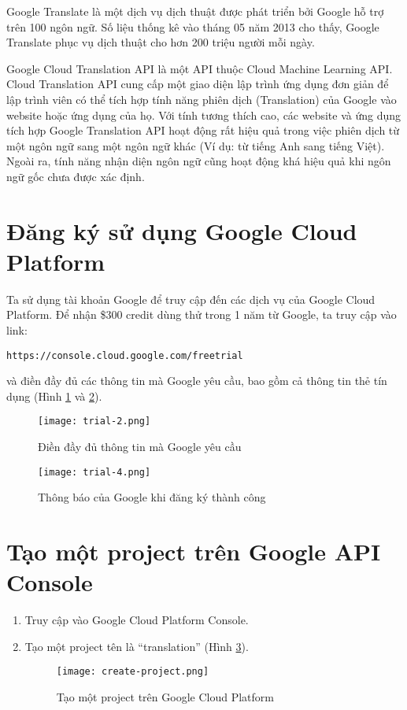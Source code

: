 \documentclass[../thesis.tex]{subfiles}
\begin{document}
Google Translate là một dịch vụ dịch thuật được phát triển bởi Google hỗ trợ trên 100 ngôn ngữ. Số liệu thống kê vào tháng 05 năm 2013 cho thấy, Google Translate phục vụ dịch thuật cho hơn 200 triệu người mỗi ngày.

Google Cloud Translation API là một API thuộc Cloud Machine Learning API. Cloud Translation API cung cấp một giao diện lập trình ứng dụng đơn giản để lập trình viên có thể tích hợp tính năng phiên dịch (Translation) của Google vào website hoặc ứng dụng của họ. Với tính tương thích cao, các website và ứng dụng tích hợp Google Translation API hoạt động rất hiệu quả trong việc phiên dịch từ một ngôn ngữ sang một ngôn ngữ khác (Ví dụ: từ tiếng Anh sang tiếng Việt). Ngoài ra, tính năng nhận diện ngôn ngữ cũng hoạt động khá hiệu quả khi ngôn ngữ gốc chưa được xác định.

\section{Đăng ký sử dụng Google Cloud Platform}
Ta sử dụng tài khoản Google để truy cập đến các dịch vụ của Google Cloud Platform. Để nhận \$300 credit dùng thử trong 1 năm từ Google, ta truy cập vào link:
\begin{lstlisting}[numbers=none, frame=none,xleftmargin=0cm]
https://console.cloud.google.com/freetrial
\end{lstlisting}
và điền đầy đủ các thông tin mà Google yêu cầu, bao gồm cả thông tin thẻ tín dụng (Hình \ref{Dien day du thong tin ma Google yeu cau} và \ref{Thong bao cua Google khi dang ky thanh cong}).

\begin{figure}
	\texttt{[image: trial-2.png]}
	\caption{Điền đầy đủ thông tin mà Google yêu cầu}
	\label{Dien day du thong tin ma Google yeu cau}
\end{figure}

\begin{figure}
	\texttt{[image: trial-4.png]}
	\caption{Thông báo của Google khi đăng ký thành công}
	\label{Thong bao cua Google khi dang ky thanh cong}
\end{figure}

\section{Tạo một project trên Google API Console}
\begin{enumerate}
	\item Truy cập vào Google Cloud Platform Console.
	\item Tạo một project tên là ``translation'' (Hình \ref{Tao mot project tren Google Cloud Platform}).
	\begin{figure}
		\texttt{[image: create-project.png]}
		\caption{Tạo một project trên Google Cloud Platform}
		\label{Tao mot project tren Google Cloud Platform}
	\end{figure}
\end{enumerate}
\end{document}
